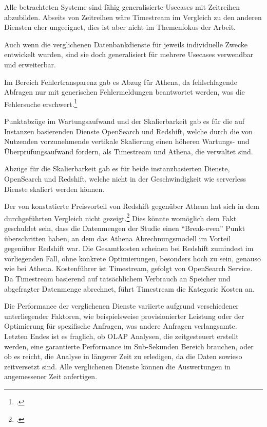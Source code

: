 Alle betrachteten Systeme sind fähig generalisierte Usecases mit Zeitreihen abzubilden. Abseits von Zeitreihen wäre Timestream im Vergleich zu den anderen Diensten eher ungeeignet, dies ist aber nicht im Themenfokus der Arbeit. 

Auch wenn die verglichenen Datenbankdienste für jeweils individuelle Zwecke entwickelt wurden, sind sie doch generalisiert für mehrere Usecases verwendbar und erweiterbar.

Im Bereich Fehlertransparenz gab es Abzug für Athena, da fehlschlagende Abfragen nur mit generischen Fehlermeldungen beantwortet werden, was die Fehlersuche erschwert.\footcite[Vgl.][]{Cooney.2020}

Punktabzüge im Wartungsaufwand und der Skalierbarkeit gab es für die auf Instanzen basierenden Dienste OpenSearch und Redshift, welche durch die von Nutzenden vorzunehmende vertikale Skalierung einen höheren Wartungs- und Überprüfungsaufwand fordern, als Timestream und Athena, die verwaltet sind.

Abzüge für die Skalierbarkeit gab es für beide instanzbasierten Dienste, OpenSearch und Redshift, welche nicht in der Geschwindigkeit wie serverless Dienste skaliert werden können.

Der von \citeauthor{Tan.2019} konstatierte Preisvorteil von Redshift gegenüber Athena hat sich in dem durchgeführten Vergleich nicht gezeigt.\footcite[Vgl.][2178\psq]{Tan.2019} Dies könnte womöglich dem Fakt geschuldet sein, dass die Datenmengen der Studie einen \enquote{Break-even} Punkt überschritten haben, an dem das Athena Abrechnungsmodell im Vorteil gegenüber Redshift war.
Die Gesamtkosten scheinen bei Redshift zumindest im vorliegenden Fall, ohne konkrete Optimierungen, besonders hoch zu sein, genauso wie bei Athena. Kostenführer ist Timestream, gefolgt von OpenSearch Service. Da Timestream basierend auf tatsächlichem Verbrauch an Speicher und abgefragter Datenmenge abrechnet, führt Timestream die Kategorie Kosten an.

Die Performance der verglichenen Dienste variierte aufgrund verschiedener unterliegender Faktoren, wie beispielsweise provisionierter Leistung oder der Optimierung für spezifische Anfragen, was andere Anfragen verlangsamte. Letzten Endes ist es fraglich, ob \ac{OLAP} Analysen, die zeitgesteuert erstellt werden, eine garantierte Performance im Sub-Sekunden Bereich brauchen, oder ob es reicht, die Analyse in längerer Zeit zu erledigen, da die Daten sowieso zeitversetzt sind.
Alle verglichenen Dienste können die Auswertungen in angemessener Zeit anfertigen. 

